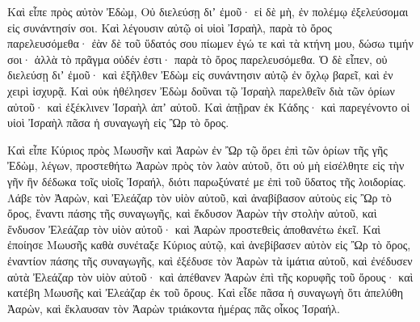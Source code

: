 {Καὶ εἶπε πρὸς αὐτὸν Ἐδὼμ, Οὐ διελεύσῃ διʼ ἐμοῦ· εἰ δὲ μὴ, ἐν πολέμῳ ἐξελεύσομαι εἰς συνάντησίν σοι.
Καὶ λέγουσιν αὐτῷ οἱ υἱοὶ Ἰσραὴλ, παρὰ τὸ ὄρος παρελευσόμεθα· ἐὰν δὲ τοῦ ὕδατός σου πίωμεν ἐγώ τε καὶ τὰ κτήνη μου, δώσω τιμήν σοι· ἀλλὰ τὸ πρᾶγμα οὐδέν ἐστι· παρὰ τὸ ὄρος παρελευσόμεθα.
Ὁ δὲ εἶπεν, οὐ διελεύσῃ διʼ ἐμοῦ· καὶ ἐξῆλθεν Ἐδὼμ εἰς συνάντησιν αὐτῷ ἐν ὄχλῳ βαρεῖ, καὶ ἐν χειρὶ ἰσχυρᾷ.
Καὶ οὐκ ἠθέλησεν Ἐδὼμ δοῦναι τῷ Ἰσραὴλ παρελθεῖν διὰ τῶν ὁρίων αὐτοῦ· καὶ ἐξέκλινεν Ἰσραὴλ ἀπʼ αὐτοῦ.
Καὶ ἀπῇραν ἐκ Κάδης· καὶ παρεγένοντο οἱ υἱοὶ Ἰσραὴλ πᾶσα ἡ συναγωγὴ εἰς Ὢρ τὸ ὄρος.
\par }{\PP {}Καὶ εἶπε Κύριος πρὸς Μωυσῆν καὶ Ἀαρὼν ἐν Ὢρ τῷ ὄρει ἐπὶ τῶν ὁρίων τῆς γῆς Ἐδὼμ, λέγων,
προστεθήτω Ἀαρὼν πρὸς τὸν λαὸν αὐτοῦ, ὅτι οὐ μὴ εἰσέλθητε εἰς τὴν γῆν ἣν δέδωκα τοῖς υἱοῖς Ἰσραήλ, διότι παρωξύνατέ με ἐπὶ τοῦ ὕδατος τῆς λοιδορίας.
Λάβε τὸν Ἀαρὼν, καὶ Ἐλεάζαρ τὸν υἱὸν αὐτοῦ, καὶ ἀναβίβασον αὐτοὺς εἰς Ὢρ τὸ ὄρος, ἔναντι πάσης τῆς συναγωγῆς,
καὶ ἔκδυσον Ἀαρὼν τὴν στολὴν αὐτοῦ, καὶ ἔνδυσον Ἐλεάζαρ τὸν υἱὸν αὐτοῦ· καὶ Ἀαρὼν προστεθεὶς ἀποθανέτω ἐκεῖ.
Καὶ ἐποίησε Μωυσῆς καθὰ συνέταξε Κύριος αὐτῷ, καὶ ἀνεβίβασεν αὐτὸν εἰς Ὢρ τὸ ὄρος, ἐναντίον πάσης τῆς συναγωγῆς,
καὶ ἐξέδυσε τὸν Ἀαρὼν τὰ ἱμάτια αὐτοῦ, καὶ ἐνέδυσεν αὐτὰ Ἐλεάζαρ τὸν υἱὸν αὐτοῦ· καὶ ἀπέθανεν Ἀαρὼν ἐπὶ τῆς κορυφῆς τοῦ ὄρους· καὶ κατέβη Μωυσῆς καὶ Ἐλεάζαρ ἐκ τοῦ ὄρους.
Καὶ εἶδε πᾶσα ἡ συναγωγὴ ὅτι ἀπελύθη Ἀαρὼν, καὶ ἔκλαυσαν τὸν Ἀαρὼν τριάκοντα ἡμέρας πᾶς οἶκος Ἰσραήλ.

}
